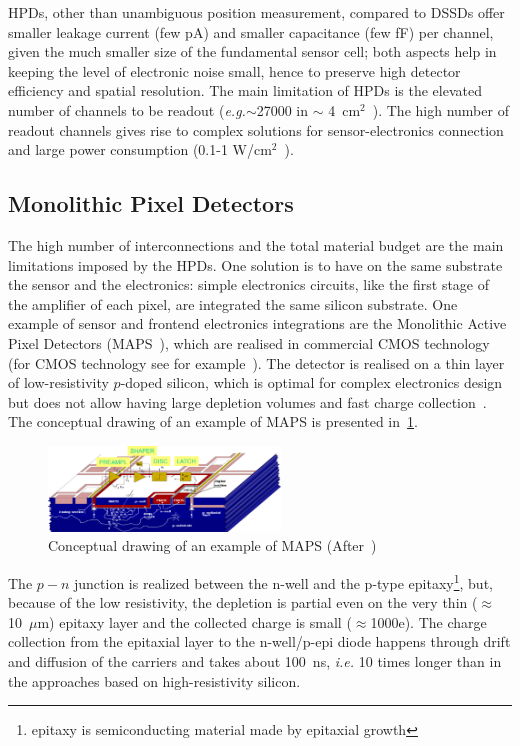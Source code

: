  
 HPDs, other than unambiguous position measurement, compared to DSSDs offer 
 smaller leakage current (few pA) and smaller capacitance (few fF) per channel, 
 given the much smaller size of the 
 fundamental sensor cell; both aspects help in keeping the level of electronic noise small, hence 
 to preserve high detector efficiency and spatial resolution.
 The main limitation of HPDs is the elevated number of channels to be readout ({\it e.g.}$\sim$27000 
 in $\sim$ 4~cm$^2$~\cite{IBLTDR}). 
 The high number 
 of readout channels gives rise to complex solutions for sensor-electronics connection and 
 large power consumption (0.1-1 W/cm$^2$~\cite{IBLTDR}).


\subsection{Monolithic Pixel Detectors}
\label{sec:MAPS}
The high number of interconnections and the total material budget are the main limitations imposed 
by the HPDs. One solution is to have on the same substrate the sensor and the electronics: 
 simple electronics circuits, like the first stage of the amplifier of each pixel, are integrated the 
 same silicon substrate. 
 One example of sensor and frontend electronics integrations are the Monolithic Active Pixel Detectors 
 (MAPS~\cite{CLAUS2001120}), which are realised  in  
 commercial CMOS technology (for CMOS technology see for example~\cite{Lutz:411172}).  
 The detector is realised on a thin layer of low-resistivity $p$-doped silicon, which is optimal for complex 
 electronics design but does not allow having large depletion volumes and fast charge 
 collection~\cite{rossi2006pixel}. The conceptual drawing of an example of MAPS is presented 
 in~\ref{fig:maps}.
 \begin{figure}[htbp]
   \centering
  \includegraphics[width=0.55\textwidth]{maps.pdf} 
      \caption{\label{fig:maps} Conceptual drawing of an example of MAPS (After~\cite{ReApsel})}
\end{figure}
The $p-n$ junction is realized between the n-well and the p-type epitaxy\footnote{epitaxy is 
semiconducting material made by epitaxial growth}, but, because of the low resistivity, the depletion is 
partial even on the very thin ($\approx$10~$\mu$m) epitaxy layer and the collected charge is small 
($\approx$1000e). The 
charge collection from the epitaxial layer to the n-well/p-epi diode happens through drift and diffusion of 
the carriers and takes about 100~ns, {\it i.e.} 10 times longer than in the approaches based on 
high-resistivity silicon.

